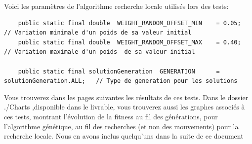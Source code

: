 	Voici les paramètres de l'algorithme recherche locale utilisés lors des tests:

		\begin{lstlisting}
	public static final double 	WEIGHT_RANDOM_OFFSET_MIN 	= 0.05; 	// Variation minimale d'un poids de sa valeur initial 
	public static final double 	WEIGHT_RANDOM_OFFSET_MAX 	= 0.40; 	// Variation maximale d'un poids  de sa valeur initial 

	public static final solutionGeneration 	GENERATION 		= solutionGeneration.ALL; 	// Type de generation pour les solutions
	\end{lstlisting}

	Vous trouverez dans les pages suivantes les résultats de ces tests. Dans le dossier ./Charts ,disponible dans le livrable, vous trouverez aussi les graphes associés à ces tests, montrant l'évolution de la fitness au fil des générations, pour l'algorithme 
génétique, au fil des recherches (et non des mouvements) pour la recherche locale. Nous en avons inclus quelqu'uns dans la suite de ce document

